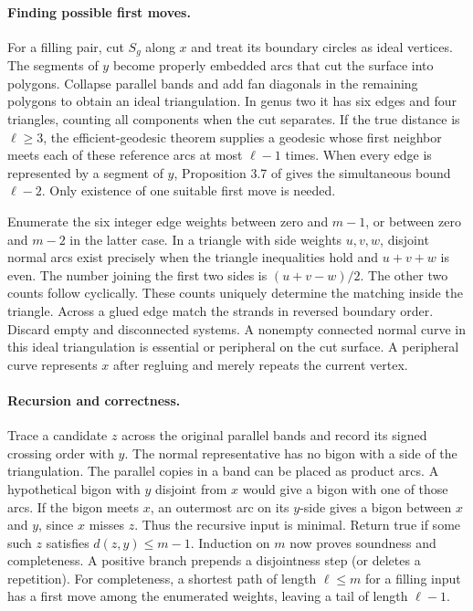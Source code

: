 \documentclass[11pt,a4paper]{article}
\begin{document}
\paragraph{Finding possible first moves.}
For a filling pair, cut \(S_g\) along \(x\) and treat its boundary
circles as ideal vertices. The segments of \(y\) become properly
embedded arcs that cut the surface into polygons. Collapse parallel
bands and add fan diagonals in the remaining polygons to obtain an ideal
triangulation. In genus two it has six edges and four triangles, counting
all components when the cut separates. If the true distance is
\(\ell\ge3\), the efficient-geodesic theorem \cite[Theorem 1.1]{BMM}
supplies a geodesic whose first neighbor meets each of these reference
arcs at most \(\ell-1\) times. When every edge is represented by a
segment of \(y\), Proposition 3.7 of \cite{BMM} gives the simultaneous
bound \(\ell-2\). Only existence of one suitable first move is needed.

Enumerate the six integer edge weights between zero and \(m-1\), or
between zero and \(m-2\) in the latter case. In a triangle with side
weights \(u,v,w\), disjoint normal arcs exist precisely when the triangle
inequalities hold and \(u+v+w\) is even. The number joining the first
two sides is \((u+v-w)/2\). The other two counts follow cyclically.
These counts uniquely determine the matching inside the triangle.
Across a glued edge match the strands in reversed boundary order.
Discard empty and disconnected systems. A nonempty connected normal
curve in this ideal triangulation is essential or peripheral on the cut
surface. A peripheral curve represents \(x\) after regluing and merely
repeats the current vertex.

\paragraph{Recursion and correctness.}
Trace a candidate \(z\) across the original parallel bands and record
its signed crossing order with \(y\). The normal representative has no
bigon with a side of the triangulation. The parallel copies in a band
can be placed as product arcs. A hypothetical bigon with \(y\) disjoint
from \(x\) would give a bigon with one of those arcs. If the bigon meets
\(x\), an outermost arc on its \(y\)-side gives a bigon between \(x\)
and \(y\), since \(x\) misses \(z\). Thus the recursive input is minimal.
Return true if some such \(z\) satisfies \(d(z,y)\le m-1\). Induction on
\(m\) now proves soundness and completeness. A positive branch
prepends a disjointness step (or deletes a repetition). For completeness,
a shortest path of length \(\ell\le m\) for a filling input has a first
move among the enumerated weights, leaving a tail of length \(\ell-1\).
\end{document}
